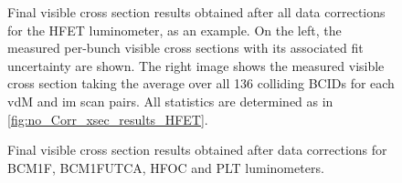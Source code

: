 \begin{figure}[!htb]
	\centering
	\caption[Final HFET visible cross section results]{Final visible cross section results obtained after all data corrections for the HFET luminometer, as an example. On the left, the measured per-bunch visible cross sections with its associated fit uncertainty are shown. The right image shows the measured visible cross section taking the average over all 136 colliding BCIDs for each vdM and im scan pairs. All statistics are determined as in \autoref{fig:no_Corr_xsec_results_HFET}.}
	\label{fig:all_Corr_xsec_results_HFET}
\end{figure}

\begin{figure}[!htb]
	\centering
	\caption[Final visible cross section results for other online luminometers]{Final visible cross section results obtained after data corrections for BCM1F, BCM1FUTCA, HFOC and PLT luminometers.}
	\label{fig:all_Corr_luminometer_xsec}
\end{figure}

